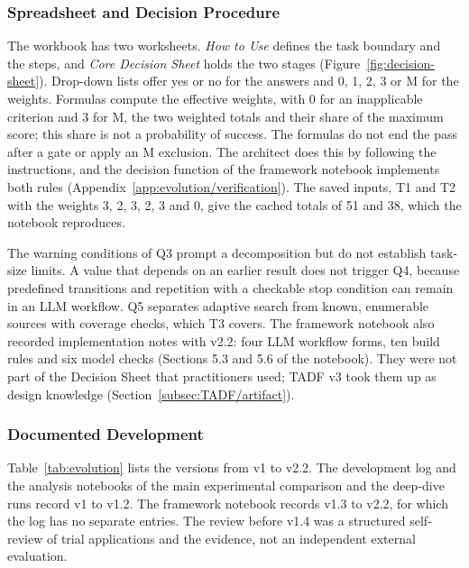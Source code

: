 \subsubsection{Spreadsheet and Decision Procedure}
\label{app:evolution/semantics}

The workbook  has two worksheets. \emph{How to Use} defines the task boundary and the steps, and \emph{Core Decision Sheet} holds the two stages (Figure~\ref{fig:decision-sheet}). Drop-down lists offer yes or no for the answers and 0, 1, 2, 3 or M for the weights. Formulas compute the effective weights, with 0 for an inapplicable criterion and 3 for M, the two weighted totals and their share of the maximum score; this share is not a probability of success. The formulas do not end the pass after a gate or apply an M exclusion. The architect does this by following the instructions, and the decision function of the framework notebook implements both rules (Appendix~\ref{app:evolution/verification}). The saved inputs, T1 and T2 with the weights 3, 2, 3, 2, 3 and 0, give the cached totals of 51 and 38, which the notebook reproduces.

The warning conditions of Q3 prompt a decomposition but do not establish task-size limits. A value that depends on an earlier result does not trigger Q4, because predefined transitions and repetition with a checkable stop condition can remain in an LLM workflow. Q5 separates adaptive search from known, enumerable sources with coverage checks, which T3 covers. The framework notebook also recorded implementation notes with v2.2: four LLM workflow forms, ten build rules and six model checks (Sections 5.3 and 5.6 of the notebook). They were not part of the Decision Sheet that practitioners used; TADF v3 took them up as design knowledge (Section~\ref{subsec:TADF/artifact}).

\subsubsection{Documented Development}
\label{app:evolution/development}

Table~\ref{tab:evolution} lists the versions from v1 to v2.2. The development log and the analysis notebooks of the main experimental comparison and the deep-dive runs record v1 to v1.2. The framework notebook records v1.3 to v2.2, for which the log has no separate entries. The review before v1.4 was a structured self-review of trial applications and the evidence, not an independent external evaluation.

